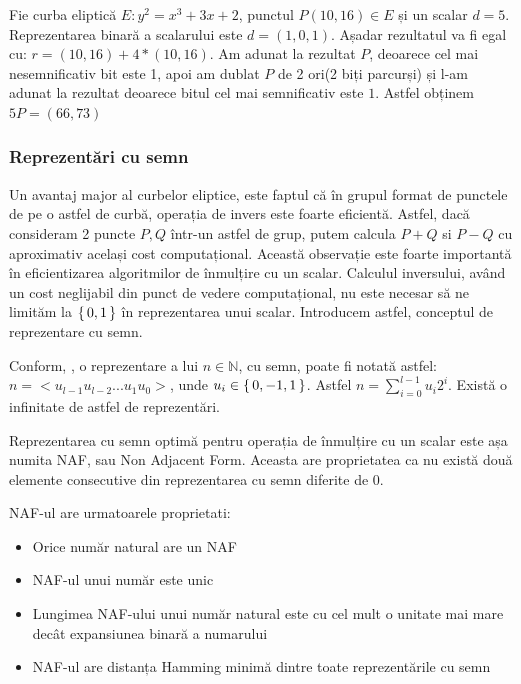 \begin{ex}
Fie curba eliptică $E: y^2 = x^3 + 3x + 2$, punctul $P(10, 16)\in E$ și un scalar $d = 5$. Reprezentarea binară a scalarului este $d = (1, 0, 1)$. Așadar rezultatul va fi egal cu: $r = (10, 16) + 4*(10, 16)$. Am adunat la rezultat $P$, deoarece cel mai nesemnificativ bit este 1, apoi am dublat $P$ de 2 ori(2 biți parcurși) și l-am adunat la rezultat deoarece bitul cel mai semnificativ este $1$. Astfel obținem $5P = (66, 73)$
\end{ex}

\subsubsection{Reprezentări cu semn}

Un avantaj major al curbelor eliptice, este faptul că în grupul format de punctele de pe o astfel de curbă, operația de invers este foarte eficientă. Astfel, dacă consideram 2 puncte $P, Q$ într-un astfel de grup, putem calcula $P + Q$ si $P - Q$ cu aproximativ același cost computațional. Această observație este foarte importantă în eficientizarea algoritmilor de înmulțire cu un scalar. Calculul inversului, având un cost neglijabil din punct de vedere computațional, nu este necesar să ne limităm la $\set{0, 1}$ în reprezentarea unui scalar. Introducem astfel, conceptul de reprezentare cu semn.

\begin{dfn}
Conform, \cite{solinas}, o reprezentare a lui $n\in\mathbb{N}$, cu semn, poate fi notată astfel: $n = <u_{l-1}u_{l-2}...u_1u_0>$, unde $u_i\in\set{0, -1, 1}$. Astfel $n = \sum_{i=0}^{l-1} u_i 2^{i}$. Există o infinitate de astfel de reprezentări.
\end{dfn}
\begin{dfn}
Reprezentarea cu semn optimă pentru operația de înmulțire cu un scalar este așa numita NAF, sau Non Adjacent Form. Aceasta are proprietatea ca nu există două elemente consecutive din reprezentarea cu semn diferite de 0.
\end{dfn}

\begin{teo}
NAF-ul are urmatoarele proprietati:
\begin{itemize}
  \item Orice număr natural are un NAF
  \item NAF-ul unui număr este unic
  \item Lungimea NAF-ului unui număr natural este cu cel mult o unitate mai mare decât expansiunea binară a numarului 
  \item NAF-ul are distanța Hamming minimă dintre toate reprezentările cu semn
\end{itemize}
\end{teo}

